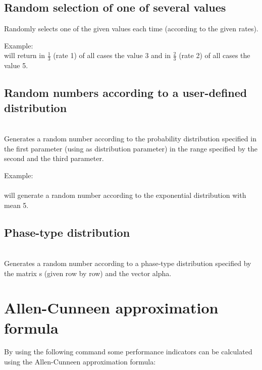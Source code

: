 \section{Random selection of one of several values}

Randomly selects one of the given values each time (according to the given rates).

Example:
\\
will return in $\frac{1}{3}$ (rate 1) of all cases the value 3 and in $\frac{2}{3}$ (rate 2) of all cases the value 5.



\section{Random numbers according to a user-defined distribution}

\\
Generates a random number according to the probability distribution specified in the first parameter (using  as distribution parameter) in the range specified by the second and the third parameter.

Example:\\
\\
will generate a random number according to the exponential distribution with mean 5.



\section{Phase-type distribution}

\\
Generates a random number according to a phase-type distribution specified by the matrix s (given row by row) and the vector alpha.



\chapter{Allen-Cunneen approximation formula}

By using the following command some performance indicators can be calculated
using the Allen-Cunneen approximation formula:

